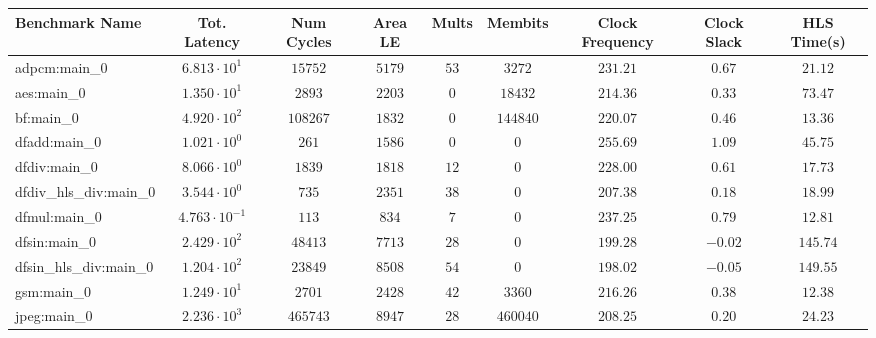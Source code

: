 \begin{tabular}{|l|c|c|c|c|c|c|c|c|}
\hline
Benchmark Name          & Tot. Latency            & Num Cycles & Area LE   & Mults   & Membits    & Clock Frequency & Clock Slack & HLS Time(s) \\
\hline
adpcm:main\_0           & $ 6.813 \cdot 10^{1}  $ & $ 15752  $ & $ 5179  $ & $ 53  $ & $ 3272   $ & $ 231.21      $ & $ 0.67    $ & $ 21.12   $ \\
aes:main\_0             & $ 1.350 \cdot 10^{1}  $ & $ 2893   $ & $ 2203  $ & $ 0   $ & $ 18432  $ & $ 214.36      $ & $ 0.33    $ & $ 73.47   $ \\
bf:main\_0              & $ 4.920 \cdot 10^{2}  $ & $ 108267 $ & $ 1832  $ & $ 0   $ & $ 144840 $ & $ 220.07      $ & $ 0.46    $ & $ 13.36   $ \\
dfadd:main\_0           & $ 1.021 \cdot 10^{0}  $ & $ 261    $ & $ 1586  $ & $ 0   $ & $ 0      $ & $ 255.69      $ & $ 1.09    $ & $ 45.75   $ \\
dfdiv:main\_0           & $ 8.066 \cdot 10^{0}  $ & $ 1839   $ & $ 1818  $ & $ 12  $ & $ 0      $ & $ 228.00      $ & $ 0.61    $ & $ 17.73   $ \\
dfdiv\_hls\_div:main\_0 & $ 3.544 \cdot 10^{0}  $ & $ 735    $ & $ 2351  $ & $ 38  $ & $ 0      $ & $ 207.38      $ & $ 0.18    $ & $ 18.99   $ \\
dfmul:main\_0           & $ 4.763 \cdot 10^{-1} $ & $ 113    $ & $ 834   $ & $ 7   $ & $ 0      $ & $ 237.25      $ & $ 0.79    $ & $ 12.81   $ \\
dfsin:main\_0           & $ 2.429 \cdot 10^{2}  $ & $ 48413  $ & $ 7713  $ & $ 28  $ & $ 0      $ & $ 199.28      $ & $ -0.02   $ & $ 145.74  $ \\
dfsin\_hls\_div:main\_0 & $ 1.204 \cdot 10^{2}  $ & $ 23849  $ & $ 8508  $ & $ 54  $ & $ 0      $ & $ 198.02      $ & $ -0.05   $ & $ 149.55  $ \\
gsm:main\_0             & $ 1.249 \cdot 10^{1}  $ & $ 2701   $ & $ 2428  $ & $ 42  $ & $ 3360   $ & $ 216.26      $ & $ 0.38    $ & $ 12.38   $ \\
jpeg:main\_0            & $ 2.236 \cdot 10^{3}  $ & $ 465743 $ & $ 8947  $ & $ 28  $ & $ 460040 $ & $ 208.25      $ & $ 0.20    $ & $ 24.23   $ \\

\end{tabular}
